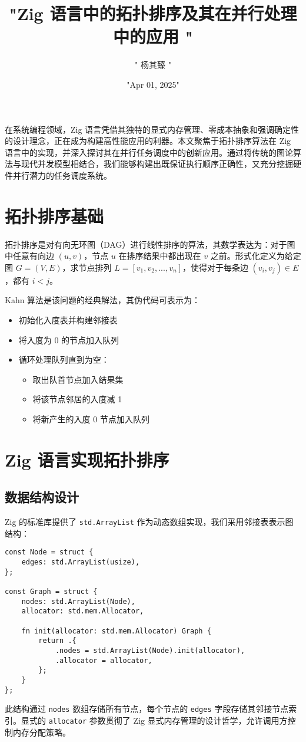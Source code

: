 \title{"Zig 语言中的拓扑排序及其在并行处理中的应用 "}
\author{" 杨其臻 "}
\date{"Apr 01, 2025"}
\maketitle
在系统编程领域，Zig 语言凭借其独特的显式内存管理、零成本抽象和强调确定性的设计理念，正在成为构建高性能应用的利器。本文聚焦于拓扑排序算法在 Zig 语言中的实现，并深入探讨其在并行任务调度中的创新应用。通过将传统的图论算法与现代并发模型相结合，我们能够构建出既保证执行顺序正确性，又充分挖掘硬件并行潜力的任务调度系统。\par
\chapter{拓扑排序基础}
拓扑排序是对有向无环图（DAG）进行线性排序的算法，其数学表达为：对于图中任意有向边 $(u, v)$，节点 $u$ 在排序结果中都出现在 $v$ 之前。形式化定义为给定图 $G=(V, E)$，求节点排列 $L = [v_1, v_2, ..., v_n]$，使得对于每条边 $(v_i, v_j) \in E$，都有 $i < j$。\par
Kahn 算法是该问题的经典解法，其伪代码可表示为：\par
\begin{itemize}
\item 初始化入度表并构建邻接表
\item 将入度为 0 的节点加入队列
\item 循环处理队列直到为空：\begin{itemize}
\item 取出队首节点加入结果集
\item 将该节点邻居的入度减 1
\item 将新产生的入度 0 节点加入队列
\end{itemize}

\end{itemize}
\chapter{Zig 语言实现拓扑排序}
\section{数据结构设计}
Zig 的标准库提供了 \verb!std.ArrayList! 作为动态数组实现，我们采用邻接表表示图结构：\par
\begin{lstlisting}[language=zig]
const Node = struct {
    edges: std.ArrayList(usize),
};

const Graph = struct {
    nodes: std.ArrayList(Node),
    allocator: std.mem.Allocator,

    fn init(allocator: std.mem.Allocator) Graph {
        return .{
            .nodes = std.ArrayList(Node).init(allocator),
            .allocator = allocator,
        };
    }
};
\end{lstlisting}
此结构通过 \verb!nodes! 数组存储所有节点，每个节点的 \verb!edges! 字段存储其邻接节点索引。显式的 \verb!allocator! 参数贯彻了 Zig 显式内存管理的设计哲学，允许调用方控制内存分配策略。\par
